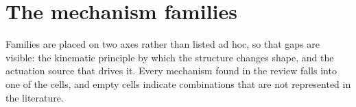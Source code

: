 \section{The mechanism families}
\label{sec:families}

Families are placed on two axes rather than listed ad hoc, so that gaps are visible: the kinematic principle by which the structure changes shape, and the actuation source that drives it. Every mechanism found in the review falls into one of the cells, and empty cells indicate combinations that are not represented in the literature.



